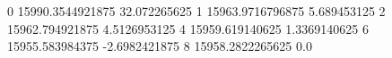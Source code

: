 0 15990.3544921875 32.072265625
1 15963.9716796875 5.689453125
2 15962.794921875 4.5126953125
4 15959.619140625 1.3369140625
6 15955.583984375 -2.6982421875
8 15958.2822265625 0.0

